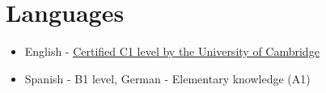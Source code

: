 \documentclass[a4paper,11pt]{article}
\newcommand{\resumeItem}[1]{
  \item\small{#1}
}
\newcommand{\resumeItemListStart}{\begin{itemize}[rightmargin=0.11in]}
\newcommand{\resumeItemListEnd}{\end{itemize}}
\begin{document}

\section{Languages}
  \resumeItemListStart{}
    \resumeItem{English - \href{https://www.cambridgeenglish.org/exams-and-tests/cambridge-english-scale/}{\uline{Certified C1 level by the University of Cambridge}}}
    \resumeItem{Spanish - B1 level, German - Elementary knowledge (A1)}
  \resumeItemListEnd{}
\end{document}

